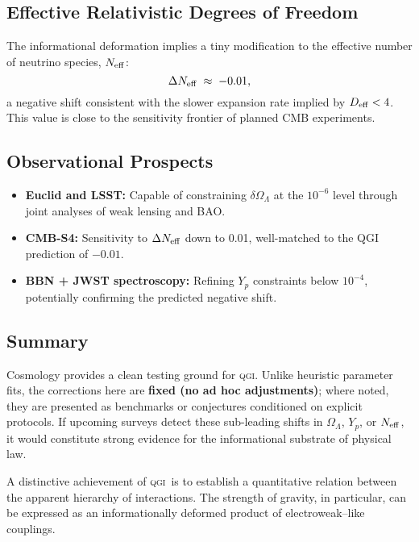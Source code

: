 \documentclass{article}
\numberwithin{equation}{section}
\theoremstyle{plain}
\theoremstyle{definition}
\theoremstyle{remark}
\newcommand{\qgi}{\textsc{qgi}}
\begin{document}
\subsection{Effective Relativistic Degrees of Freedom}
The informational deformation implies a tiny modification to the effective number of neutrino species, $N_{\rm eff}$:
\begin{equation}
\Delta N_{\rm eff} \;\approx\; -0.01,
\end{equation}
a negative shift consistent with the slower expansion rate implied by $D_{\rm eff} < 4$. This value is close to the sensitivity frontier of planned CMB experiments.

\subsection{Observational Prospects}
\begin{itemize}
    \item \textbf{Euclid and LSST:} Capable of constraining $\delta \Omega_\Lambda$ at the $10^{-6}$ level through joint analyses of weak lensing and BAO.
    \item \textbf{CMB-S4:} Sensitivity to $\Delta N_{\rm eff}$ down to 0.01, well-matched to the QGI prediction of $-0.01$.
    \item \textbf{BBN + JWST spectroscopy:} Refining $Y_p$ constraints below $10^{-4}$, potentially confirming the predicted negative shift.
\end{itemize}

\subsection{Summary}
Cosmology provides a clean testing ground for \qgi. 
Unlike heuristic parameter fits, the corrections here are \textbf{fixed (no ad hoc adjustments)}; where noted, they are presented as benchmarks or conjectures conditioned on explicit protocols.
If upcoming surveys detect these sub-leading shifts in $\Omega_\Lambda$, $Y_p$, or $N_{\rm eff}$, it would constitute strong evidence for the informational substrate of physical law.


\label{app:forces}

A distinctive achievement of \qgi\ is to establish a quantitative relation between the apparent hierarchy of interactions. 
The strength of gravity, in particular, can be expressed as an informationally deformed product of electroweak–like couplings. 
\end{document}
